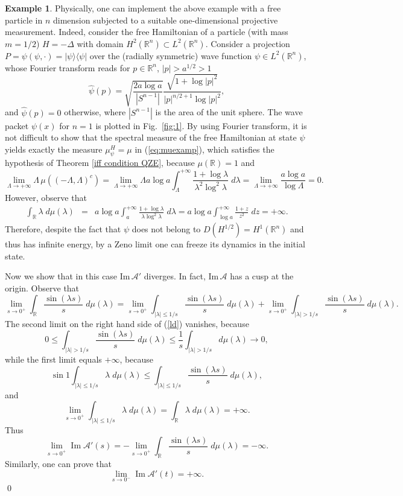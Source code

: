 \documentclass[aip,jmp
]{revtex4}
\renewcommand{\Im}{\mathop{\mathrm{Im}}\nolimits}
\newcommand{\RM}{\mathbb{R}}
\theoremstyle{definition}
\newtheorem{example}{Example}
\begin{document}
\begin{example}
Physically, one can implement the above example with a free particle in $n$ dimension subjected to a suitable one-dimensional projective measurement. Indeed, consider the free Hamiltonian  of a particle (with mass $m=1/2$)  $H=-\Delta$ with domain $H^2(\mathbb{R}^n)\subset L^2(\mathbb{R}^n)$.  Consider a projection $P=\psi(\psi,\cdot)=|\psi\rangle \langle\psi|$ over the (radially symmetric) wave function  $\psi\in L^2(\mathbb{R}^n)$, whose Fourier transform reads for $p\in \mathbb{R}^n$, $|p|>a^{1/2}>1$
\[
\hat{\psi}(p)=\sqrt{\frac{2 a\log a }{|S^{n-1}|}}\frac{\sqrt{1+\log |p|^2}}{|p|^{n/2+1} \log |p|^2},
\]
and $\hat{\psi}(p)=0$ otherwise,
where $|S^{n-1}|$ is the area of the unit sphere. The wave packet $\psi(x)$ for $n=1$ is plotted in Fig.\ \ref{fig:1}.
By using Fourier transform, it is not difficult to show that the spectral measure of the free Hamiltonian at state $\psi$ yields exactly the measure $\mu_\psi^H=\mu$ in (\ref{eq:muexamp}), which satisfies the hypothesis of Theorem \ref{iff
condition QZE}, because $\mu(\RM)=1$ and
\[
\lim_{\Lambda \to +\infty} \Lambda\, \mu((-\Lambda, \Lambda)^c)= \lim_{\Lambda \to +\infty} \Lambda a \log a \int_{\Lambda}^{+\infty} \frac{1+\log \lambda}{\lambda^2 \log^2 \lambda} \; d\lambda= \lim_{\Lambda \to +\infty} \frac{a\log a}{\log \Lambda}=0.
\]
However, observe that
\begin{eqnarray*}
\int_{\RM} \lambda \; d\mu(\lambda) & = & a\log a\int_{a}^{+\infty} \frac{1+\log \lambda}{\lambda \log^2 \lambda} \; d\lambda =
                                     a\log a\int_{\log a}^{+\infty} \frac{1+z}{z^2} \; dz 
                                                                       =  + \infty.
\end{eqnarray*}
Therefore, despite the fact that $\psi$ does not belong to $D(H^{1/2})=H^1(\mathbb{R}^n)$ and thus has infinite energy, by a Zeno limit one can freeze its dynamics in the initial state.



Now we show that in this case Im$\,\mathcal{A}'$ diverges. In fact, Im$\,\mathcal{A}$ has a cusp at the origin. Observe that
\begin{equation}\label{ld}
\lim_{s \to 0^+}\int_{\RM}  \frac{\sin(\lambda s)}{s}\; d\mu(\lambda)  = \lim_{s \to 0^+}\int_{|\lambda|\leq 1/s}  \frac{\sin(\lambda s)}{s}\; d\mu(\lambda)+\lim_{s \to 0^+} \int_{|\lambda| > 1/s}  \frac{\sin(\lambda s)}{s}\; d\mu(\lambda).
\end{equation}
The second limit on the right hand side of (\ref{ld}) vanishes, because
\[
0 \leq \int_{|\lambda| > 1/s}  \frac{\sin(\lambda s)}{s}\; d\mu(\lambda) \leq \frac{1}{s}\int_{|\lambda| > 1/s} d\mu(\lambda) \to 0 ,
\]
while the first limit equals  $+\infty$, because
\[
\sin 1 \int_{|\lambda|\leq 1/s} \lambda \; d\mu(\lambda) \leq \int_{|\lambda|\leq 1/s} \frac{\sin(\lambda s)}{s}\; d\mu(\lambda),
\]
and
\[
\lim_{s \to 0^+} \int_{|\lambda|\leq 1/s} \lambda \; d\mu(\lambda) = \int_{\RM} \lambda\; d\mu(\lambda)=+\infty.
\]
Thus
\[
\lim_{s \to 0^+} \Im \mathcal{A}'(s)=-\lim_{s \to 0^+}\int_{\RM}  \frac{\sin(\lambda s)}{s}\; d\mu(\lambda)  = -\infty.
\]
Similarly, one can prove that
\[
\lim_{s \to 0^-} \Im \mathcal{A}'(t)= + \infty.
\]
\qed
\end{example}
\end{document}
